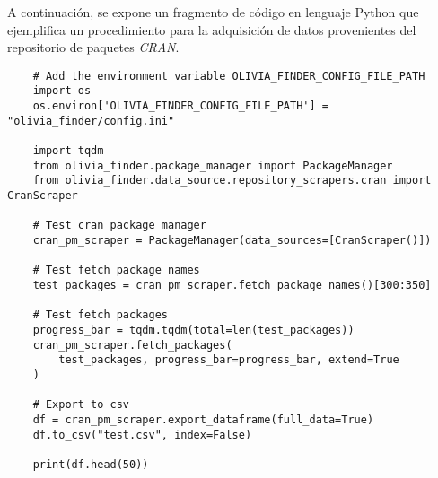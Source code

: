 \newpage

A continuación, se expone un fragmento de código en lenguaje Python que ejemplifica un procedimiento
para la adquisición de datos provenientes del repositorio de paquetes \textit{CRAN}.

\begin{small}
    \begin{verbatim}
    # Add the environment variable OLIVIA_FINDER_CONFIG_FILE_PATH
    import os
    os.environ['OLIVIA_FINDER_CONFIG_FILE_PATH'] = "olivia_finder/config.ini"
    
    import tqdm
    from olivia_finder.package_manager import PackageManager
    from olivia_finder.data_source.repository_scrapers.cran import CranScraper
    
    # Test cran package manager
    cran_pm_scraper = PackageManager(data_sources=[CranScraper()])
    
    # Test fetch package names
    test_packages = cran_pm_scraper.fetch_package_names()[300:350]
    
    # Test fetch packages
    progress_bar = tqdm.tqdm(total=len(test_packages))
    cran_pm_scraper.fetch_packages(
        test_packages, progress_bar=progress_bar, extend=True
    )
    
    # Export to csv
    df = cran_pm_scraper.export_dataframe(full_data=True)
    df.to_csv("test.csv", index=False)
    
    print(df.head(50))
    \end{verbatim}
\end{small}




